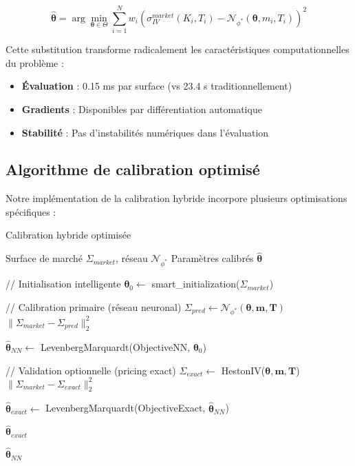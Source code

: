 \begin{equation}
\hat{\boldsymbol{\theta}} = \arg\min_{\boldsymbol{\theta} \in \Theta} \sum_{i=1}^{N} w_i \left(\sigma_{IV}^{market}(K_i, T_i) - \mathcal{N}_{\phi^*}(\boldsymbol{\theta}, m_i, T_i)\right)^2
\end{equation}

Cette substitution transforme radicalement les caractéristiques computationnelles du problème :
\begin{itemize}
\item \textbf{Évaluation} : 0.15 ms par surface (vs 23.4 s traditionnellement)
\item \textbf{Gradients} : Disponibles par différentiation automatique
\item \textbf{Stabilité} : Pas d'instabilités numériques dans l'évaluation
\end{itemize}

\subsection{Algorithme de calibration optimisé}

Notre implémentation de la calibration hybride incorpore plusieurs optimisations spécifiques :

\begin{algorithm}[H]
\caption{Calibration hybride optimisée}
\begin{algorithmic}
\REQUIRE Surface de marché $\Sigma_{market}$, réseau $\mathcal{N}_{\phi^*}$
\ENSURE Paramètres calibrés $\hat{\boldsymbol{\theta}}$

\STATE // Initialisation intelligente
\STATE $\boldsymbol{\theta}_0 \leftarrow$ smart\_initialization($\Sigma_{market}$)

\STATE // Calibration primaire (réseau neuronal)
    \STATE $\Sigma_{pred} \leftarrow \mathcal{N}_{\phi^*}(\boldsymbol{\theta}, \boldsymbol{m}, \boldsymbol{T})$
    \RETURN $\|\Sigma_{market} - \Sigma_{pred}\|_2^2$
\ENDFUNCTION

\STATE $\hat{\boldsymbol{\theta}}_{NN} \leftarrow$ LevenbergMarquardt(ObjectiveNN, $\boldsymbol{\theta}_0$)

\STATE // Validation optionnelle (pricing exact)
        \STATE $\Sigma_{exact} \leftarrow$ HestonIV($\boldsymbol{\theta}, \boldsymbol{m}, \boldsymbol{T}$)
        \RETURN $\|\Sigma_{market} - \Sigma_{exact}\|_2^2$
    \ENDFUNCTION
    
    \STATE $\hat{\boldsymbol{\theta}}_{exact} \leftarrow$ LevenbergMarquardt(ObjectiveExact, $\hat{\boldsymbol{\theta}}_{NN}$)
    
        \RETURN $\hat{\boldsymbol{\theta}}_{exact}$
    \ENDIF
\ENDIF

\RETURN $\hat{\boldsymbol{\theta}}_{NN}$
\end{algorithmic}
\end{algorithm}

